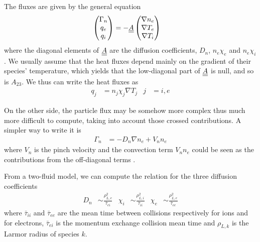 The fluxes are given by the general equation \cite{wesson}
\begin{align*}
	\begin{pmatrix}
		\Gamma_n\\
		q_e\\
		q_i
	\end{pmatrix} & = - \underline{\underline{A}}
	\begin{pmatrix}
		\nabla n_e\\
		\nabla T_e\\
		\nabla T_i
	\end{pmatrix}
\end{align*}
where the diagonal elements of $\underline{\underline{A}}$ are the diffusion coefficients, $D_n$, $n_e \chi_e$ and $n_e \chi_i$. We usually assume that the heat fluxes depend mainly on the gradient of their species' temperature, which yields that the low-diagonal part of $\underline{\underline{A}}$ is null, and so is $A_{23}$. We thus can write the heat fluxes as
\begin{align}
	q_j & = n_j \chi_j \nabla T_j   & j & = i, e             \label{eq:confinement:transport:heat:heatFlux}
\end{align}
	
On the other side, the particle flux may be somehow more complex thus much more difficult to compute, taking into account those crossed contributions. A simpler way to write it is
\begin{align}
	\Gamma_n & = - D_n \nabla n_e + V_n n_e \label{eq:confinement:transport:particle:particleFlux}
\end{align}
where $V_n$ is the pinch velocity and the convection term $V_n n_e$ could be seen as the contributions from the off-diagonal terms \cite{wesson}.

From a two-fluid model, we can compute the relation for the three diffusion coefficients \cite{freidberg}
\begin{align}\label{eq:confinement:transport:chis}
	D_n    & \sim \frac{\rho_{L,e}^2}{\bar{\tau}_{ei}} &
	\chi_i & \sim \frac{\rho_{L,i}^2}{\bar{\tau}_{ii}} &
	\chi_e & \sim \frac{\rho_{L,e}^2}{\bar{\tau}_{ee}}
\end{align}
where $\bar{\tau}_{ii}$ and $\bar{\tau}_{ee}$ are the mean time between collisions respectively for ions and for electrons, $\bar{\tau}_{ei}$ is the momentum exchange collision mean time and $\rho_{L,k}$ is the Larmor radius of species $k$.
		
